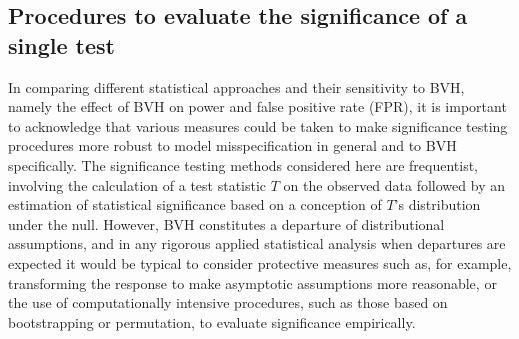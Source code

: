
\subsection{Procedures to evaluate the significance of a single test}

  In comparing different statistical approaches and their sensitivity to BVH, namely the effect of BVH on power and false positive rate (FPR), it is important to acknowledge that various measures could be taken to make significance testing procedures more robust to model misspecification in general and to BVH specifically.
  The significance testing methods considered here are frequentist, involving the calculation of a test statistic $T$ on the observed data followed by an estimation of statistical significance based on a conception of $T$'s distribution under the null.
  However, BVH constitutes a departure of distributional assumptions, and in any rigorous applied statistical analysis when departures are expected it would be typical to consider protective measures such as, for example, transforming the response to make asymptotic assumptions more reasonable, or the use of computationally intensive procedures, such as those based on bootstrapping or permutation, to evaluate significance empirically. 


